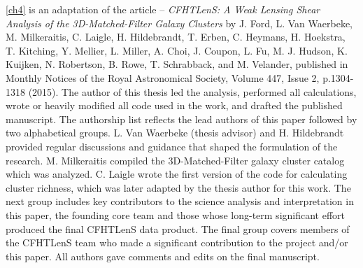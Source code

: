 \autoref{ch4} is an adaptation of the article -- {\it CFHTLenS: A Weak Lensing Shear Analysis of the 3D-Matched-Filter Galaxy Clusters} by J. Ford, L. Van Waerbeke, M. Milkeraitis, C. Laigle, H. Hildebrandt, T. Erben, C. Heymans, H. Hoekstra, T. Kitching, Y. Mellier, L. Miller, A. Choi, J. Coupon, L. Fu, M. J. Hudson, K. Kuijken, N. Robertson, B. Rowe, T. Schrabback, and M. Velander, published in Monthly Notices of the Royal Astronomical Society, Volume 447, Issue 2, p.1304-1318 (2015). The author of this thesis led the analysis, performed all calculations, wrote or heavily modified all code used in the work, and drafted the published manuscript. The authorship list reflects the lead authors of this paper followed by two alphabetical groups. L. Van Waerbeke (thesis advisor) and H. Hildebrandt provided regular discussions and guidance that shaped the formulation of the research. M. Milkeraitis compiled the 3D-Matched-Filter galaxy cluster catalog which was analyzed. C. Laigle wrote the first version of the code for calculating cluster richness, which was later adapted by the thesis author for this work. The next group includes key contributors to the science analysis and interpretation in this paper, the founding core team and those whose long-term significant effort produced the final CFHTLenS data product. The final group covers members of the CFHTLenS team who made a significant contribution to the project and/or this paper. All authors gave comments and edits on the final manuscript.

